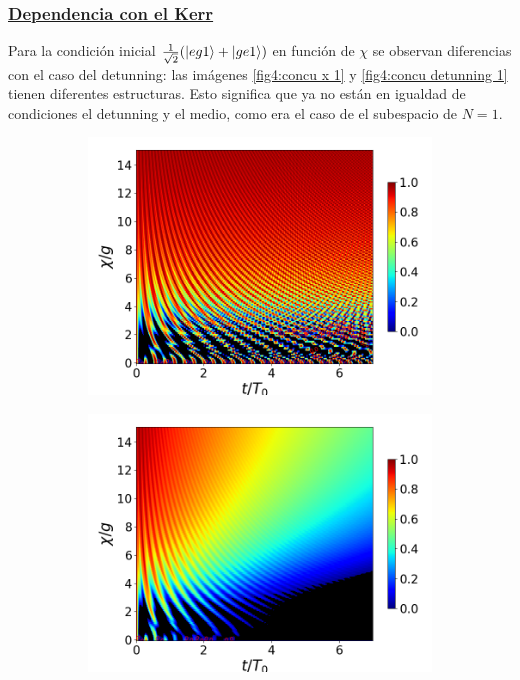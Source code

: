 \subsubsection{\underline{Dependencia con el Kerr}}
Para la condición inicial $\frac{1}{\sqrt{2}}(\ket{eg1}+\ket{ge1})$ en función de $\chi$ se observan diferencias con el caso del detunning: las imágenes \ref{fig4:concu x 1} y \ref{fig4:concu detunning 1} tienen diferentes estructuras. Esto significa que ya no están en igualdad de condiciones el detunning y el medio, como era el caso de el subespacio de $N=1$.
\begin{figure}[h!]
    \centering
    \begin{subfigure}{0.49\textwidth}
        \includegraphics[width=\textwidth]{figuras/ch4/concu/chi/eg1+ge1 d=0.0g k=0.0g J=0.0g gamma=0.25g concu chi uni.png}
        \caption{}
        \label{fig4:concu x 1 uni}
    \end{subfigure}
    \hfill
    \begin{subfigure}{0.49\textwidth}
        \includegraphics[width=\textwidth]{figuras/ch4/concu/chi/eg1+ge1 d=0.0g k=0.0g J=0.0g gamma=0.25g concu chi dis.png}

\end{subfigure}
\end{figure}
